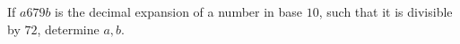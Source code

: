 If $a679b$ is the decimal expansion of a number in base $10$,  such that it is divisible by  $72$,  determine $a,b$.